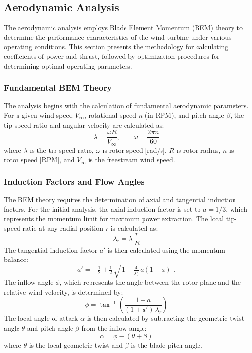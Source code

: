 \documentclass[11pt]{article}
\begin{document}
\subsection{Aerodynamic Analysis}

The aerodynamic analysis employs Blade Element Momentum (BEM) theory to determine the performance characteristics of the wind turbine under various operating conditions. This section presents the methodology for calculating coefficients of power and thrust, followed by optimization procedures for determining optimal operating parameters.

\subsubsection{Fundamental BEM Theory}

The analysis begins with the calculation of fundamental aerodynamic parameters. For a given wind speed $V_\infty$, rotational speed $n$ (in RPM), and pitch angle $\beta$, the tip-speed ratio and angular velocity are calculated as:
\begin{equation}
\lambda = \frac{\omega R}{V_\infty}, \qquad \omega = \frac{2\pi n}{60}
\label{eq:tsr_omega}
\end{equation}
where $\lambda$ is the tip-speed ratio, $\omega$ is rotor speed [rad/s], $R$ is rotor radius, $n$ is rotor speed [RPM], and $V_\infty$ is the freestream wind speed.

\subsubsection{Induction Factors and Flow Angles}

The BEM theory requires the determination of axial and tangential induction factors. For the initial analysis, the axial induction factor is set to $a = 1/3$, which represents the momentum limit for maximum power extraction. The local tip-speed ratio at any radial position $r$ is calculated as:
\begin{equation}
\lambda_r = \lambda\, \frac{r}{R}
\label{eq:lambda_r}
\end{equation}
The tangential induction factor $a'$ is then calculated using the momentum balance:
\begin{equation}
a' = -\tfrac{1}{2} + \tfrac{1}{2}\, \sqrt{\,1 + \tfrac{4}{\lambda_r^{2}}\, a(1-a)\,}\, .
\label{eq:aprime}
\end{equation}
The inflow angle $\phi$, which represents the angle between the rotor plane and the relative wind velocity, is determined by:
\begin{equation}
\phi = \tan^{-1}\!\left( \frac{1 - a}{(1 + a')\,\lambda_r} \right)
\label{eq:phi}
\end{equation}
The local angle of attack $\alpha$ is then calculated by subtracting the geometric twist angle $\theta$ and pitch angle $\beta$ from the inflow angle:
\begin{equation}
\alpha = \phi - (\theta + \beta)
\label{eq:alpha}
\end{equation}
where $\theta$ is the local geometric twist and $\beta$ is the blade pitch angle.
\end{document}
